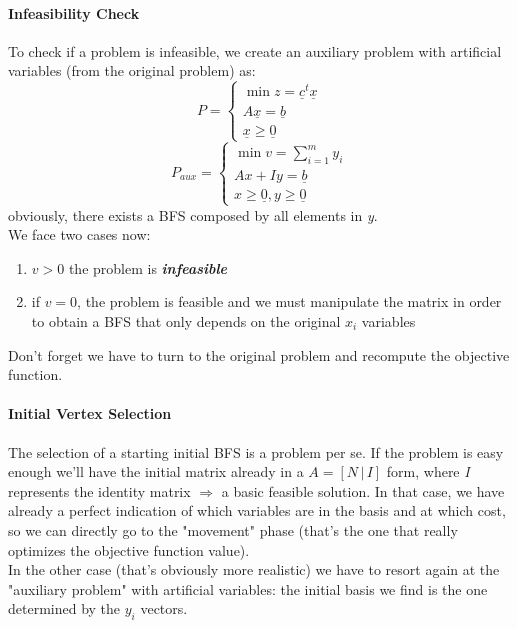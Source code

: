             \paragraph{Infeasibility Check}
            To check if a problem is infeasible, we create an auxiliary problem with artificial variables (from the original problem) as:
                \begin{equation}
                    P = 
                    \begin{cases}
                        \min z = \underline{c}^t \underline{x}\\
                        A\underline{x} = \underline{b}\\
                        \underline{x} \geq \underline{0}
                    \end{cases}
                \end{equation}
                \begin{equation}
                    P_{aux} = 
                    \begin{cases}
                        \min v = \sum_{i = 1}^m y_i\\
                        Ax + Iy= \underline{b}\\
                        x \geq \underline{0}, y \geq \underline{0}
                    \end{cases}
                \end{equation}
                obviously, there exists a BFS composed by all elements in \emph{y}.\\
                
                We face two cases now:
                \begin{enumerate}
                    \item $v > 0$ the problem is \textit{\textbf{infeasible}}
                    \item if $v = 0$, the problem is feasible and we must manipulate the matrix in order to obtain a BFS that only depends on the original $x_i$ variables
                \end{enumerate}
                Don't forget we have to turn to the original problem and recompute the objective function.

            \paragraph{Initial Vertex Selection}
                The selection of a starting initial BFS is a problem per se. If the problem is easy enough we'll have the initial matrix already in a $A = [N \,\vert\, I]$ form, where \emph{I} represents the identity matrix $\Rightarrow$ a basic feasible solution. In that case, we have already a perfect indication of which variables are in the basis and at which cost, so we can directly go to the "movement" phase (that's the one that really optimizes the objective function value).\\
                In the other case (that's obviously more realistic) we have to resort again at the "auxiliary problem" with artificial variables: the initial basis we find is the one determined by the $y_i$ vectors.

